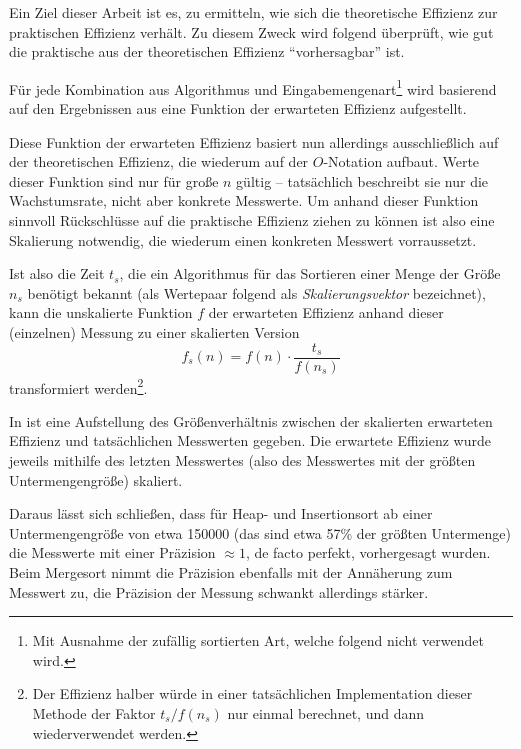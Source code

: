 Ein Ziel dieser Arbeit ist es, zu ermitteln, wie sich die theoretische Effizienz zur praktischen Effizienz verhält. Zu diesem Zweck wird folgend überprüft, wie gut die praktische aus der theoretischen Effizienz \enquote{vorhersagbar} ist.

Für jede Kombination aus Algorithmus und Eingabemengenart\footnote{Mit Ausnahme der zufällig sortierten Art, welche folgend nicht verwendet wird.} wird basierend auf den Ergebnissen aus  eine Funktion der erwarteten Effizienz aufgestellt.

Diese Funktion der erwarteten Effizienz basiert nun allerdings ausschließlich auf der theoretischen Effizienz, die wiederum auf der $O$-Notation aufbaut. Werte dieser Funktion sind nur für große $n$ gültig -- tatsächlich beschreibt sie nur die Wachstumsrate, nicht aber konkrete Messwerte. Um anhand dieser Funktion sinnvoll Rückschlüsse auf die praktische Effizienz ziehen zu können ist also eine Skalierung notwendig, die wiederum einen konkreten Messwert vorraussetzt.

Ist also die Zeit $t_s$, die ein Algorithmus für das Sortieren einer Menge der Größe $n_s$ benötigt bekannt (als Wertepaar folgend als \emph{Skalierungsvektor} bezeichnet), kann die unskalierte Funktion $f$ der erwarteten Effizienz anhand dieser (einzelnen) Messung zu einer skalierten Version
\begin{equation*}
    f_s(n) = f(n) \cdot \frac{t_s}{f(n_s)}
\end{equation*}
transformiert werden\footnote{Der Effizienz halber würde in einer tatsächlichen Implementation dieser Methode der Faktor $t_s / f(n_s)$ nur einmal berechnet, und dann wiederverwendet werden.}.



In  ist eine Aufstellung des Größenverhältnis zwischen der skalierten erwarteten Effizienz und tatsächlichen Messwerten gegeben. Die erwartete Effizienz wurde jeweils mithilfe des letzten Messwertes (also des Messwertes mit der größten Untermengengröße) skaliert.

Daraus lässt sich schließen, dass für Heap- und Insertionsort ab einer Untermengengröße von etwa 150000 (das sind etwa 57\% der größten Untermenge) die Messwerte mit einer Präzision $\approx 1$, de facto perfekt, vorhergesagt wurden. Beim Mergesort nimmt die Präzision ebenfalls mit der Annäherung zum Messwert zu, die Präzision der Messung schwankt allerdings stärker.

